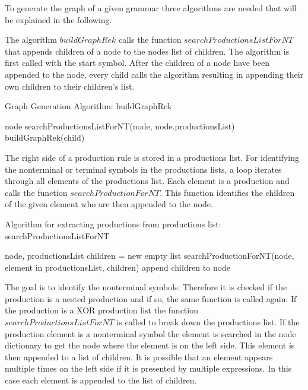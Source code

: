 To generate the graph of a given grammar three algorithms are needed that will be explained in the following. 

The algorithm $buildGraphRek$ calls the function $searchProductionsListForNT$ that appends children of a node to the nodes list of children. The algorithm is first called with the start symbol. 
After the children of a node have been appended to the node, every child calls the algorithm resulting in appending their own children to their children's list. 

\begin{algorithm}[H]
\caption{Graph Generation Algorithm: buildGraphRek}
\begin{algorithmic}[1] 
\Require node
\State searchProductionsListForNT(node, node.productionsList)
		\State buildGraphRek(child)
	\EndFor
\EndIf
\end{algorithmic}
\end{algorithm}

The right side of a production rule is stored in a productions list. For identifying the nonterminal or terminal symbols in the productions lists, a loop iterates through all elements of the productions list. Each element is a production and calls the function $searchProductionForNT$. This function identifies the children of the given element who are then appended to the node.

\begin{algorithm}[H]
\caption{Algorithm for extracting productions from productions list: searchProductionsListForNT}
\begin{algorithmic}[1] 
\Require node, productionsList
	\State children = new empty list
	\State searchProductionForNT(node, element in productionsList, children)
	\State append children to node
\EndFor
\end{algorithmic}
\end{algorithm}

The goal is to identify the nonterminal symbols. Therefore it is checked if the production is a nested production and if so, the same function is called again. If the production is a XOR production list the function $searchProductionsListForNT$ is called to break down the productions list. If the production element is a nonterminal symbol the element is searched in the node dictionary to get the node where the element is on the left side. This element is then appended to a list of children. It is possible that an element appears multiple times on the left side if it is presented by multiple expressions. In this case each element is appended to the list of children.

